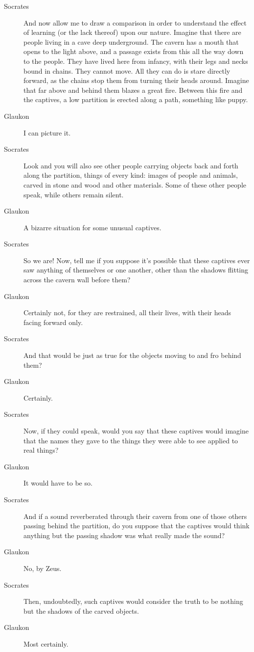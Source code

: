 \begin{description}
    \item[Socrates] And now allow me to draw a comparison in order to understand the effect of learning (or the lack thereof) upon our nature. Imagine that there are people living in a cave deep underground. The cavern has a mouth that opens to the light above, and a passage exists from this all the way down to the people. They have lived here from infancy, with their legs and necks bound in chains. They cannot move. All they can do is stare directly forward, as the chains stop them from turning their heads around. Imagine that far above and behind them blazes a great fire. Between this fire and the captives, a low partition is erected along a path, something like puppy.
    \item[Glaukon] I can picture it.
    \item[Socrates] Look and you will also see other people carrying objects back and forth along the partition, things of every kind: images of people and animals, carved in stone and wood and other materials. Some of these other people speak, while others remain silent.
    \item[Glaukon] A bizarre situation for some unusual captives.
    \item[Socrates]  So we are! Now, tell me if you suppose it's possible that these captives ever saw anything of themselves or one another, other than the shadows flitting across the cavern wall before them?
    \item[Glaukon] Certainly not, for they are restrained, all their lives, with their heads facing forward only. 
    \item[Socrates] And that would be just as true for the objects moving to and fro behind them?
    \item[Glaukon] Certainly.
    \item[Socrates]  Now, if they could speak, would you say that these captives would imagine that the names they gave to the things they were able to see applied to real things?
    \item[Glaukon] It would have to be so.
    \item[Socrates] And if a sound reverberated through their cavern from one of those others passing behind the partition, do you suppose that the captives would think anything but the passing shadow was what really made the sound? 
    \item[Glaukon] No, by Zeus. 
    \item[Socrates] Then, undoubtedly, such captives would consider the truth to be nothing but the shadows of the carved objects.
    \item[Glaukon] Most certainly.  
\end{description}



